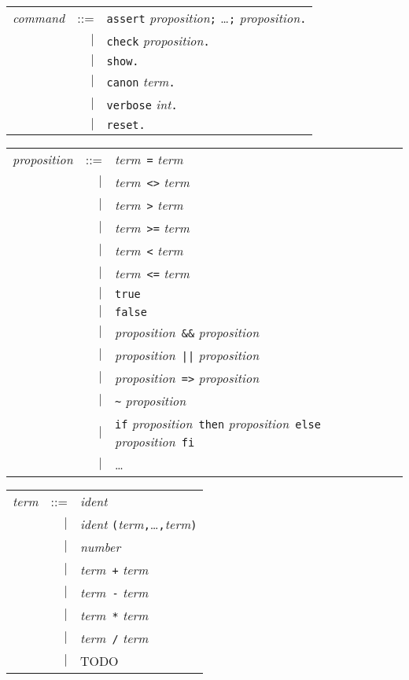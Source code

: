 \documentclass[12pt]{article}
\newcommand{\comm}{\textit{command}}
\newcommand{\term}{\textit{term}}
\newcommand{\prop}{\textit{proposition}}
\begin{document}
\begin{center}
  \begin{tabular}{rrl}
    \comm & ::= & \texttt{assert} \prop\texttt{;} \dots\texttt{;} 
                  \prop\texttt{.} \\
          & $|$ & \texttt{check} \prop\texttt{.} \\
          & $|$ & \texttt{show}\texttt{.} \\
          & $|$ & \texttt{canon} \term\texttt{.} \\
          & $|$ & \texttt{verbose} \textit{int}\texttt{.} \\
          & $|$ & \texttt{reset.} \\
  \end{tabular}
\end{center}

\begin{center}
  \begin{tabular}{rrl}
    \prop & ::= & \term\ \texttt{=} \term \\
          & $|$ & \term\ \texttt{<>} \term \\
          & $|$ & \term\ \texttt{>} \term \\
          & $|$ & \term\ \texttt{>=} \term \\
          & $|$ & \term\ \texttt{<} \term \\
          & $|$ & \term\ \texttt{<=} \term \\
          & $|$ & \texttt{true} \\
          & $|$ & \texttt{false} \\
          & $|$ & \prop\ \texttt{\&\&} \prop \\
          & $|$ & \prop\ \texttt{||} \prop \\
          & $|$ & \prop\ \texttt{=>} \prop \\
          & $|$ & \texttt{\~{}} \prop \\
          & $|$ & \texttt{if} \prop\ \texttt{then} \prop\ 
                  \texttt{else} \prop\ \texttt{fi} \\
          & $|$ & \ldots
  \end{tabular}
\end{center}

\begin{center}
  \begin{tabular}{rrl}
    \term & ::= & \textit{ident} \\
          & $|$ & \textit{ident}
                  \texttt{(}\term\texttt{,}\dots\texttt{,}\term\texttt{)} \\
          & $|$ & \textit{number} \\
          & $|$ & \term\ \texttt{+} \term \\
          & $|$ & \term\ \texttt{-} \term \\
          & $|$ & \term\ \texttt{*} \term \\
          & $|$ & \term\ \texttt{/} \term \\
          & $|$ & TODO
  \end{tabular}
\end{center}
\end{document}
